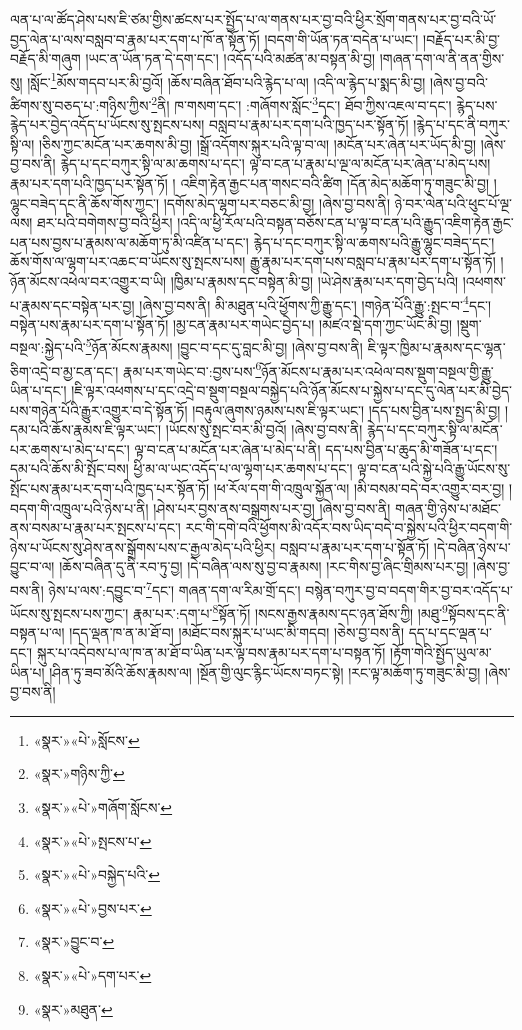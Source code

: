 ལན་པ་ལ་ཚོད་ཤེས་པས་ཇི་ཙམ་གྱིས་ཚངས་པར་སྤྱོད་པ་ལ་གནས་པར་བྱ་བའི་ཕྱིར་སྲོག་གནས་པར་བྱ་བའི་ཡོ་བྱད་ལེན་པ་ལས་བསླབ་བ་རྣམ་པར་དག་པ་ཁོ་ན་སྟོན་ཏོ། །བདག་གི་ཡོན་ཏན་བདེན་པ་ཡང་། །བརྗོད་པར་མི་བྱ་བརྗོད་མི་གཞུག །ཡང་ན་ཡོན་ཏན་དེ་དག་དང་། །འདོད་པའི་མཚན་མ་བསྟན་མི་བྱ། །གཞན་དག་ལ་ནི་ནན་གྱིས་སུ། །སློང་\footnote{«སྣར་»«པེ་»སློངས་}མོས་གདབ་པར་མི་བྱའོ། །ཆོས་བཞིན་ཐོབ་པའི་རྙེད་པ་ལ། །འདི་ལ་རྙེད་པ་སྨད་མི་བྱ། །ཞེས་བྱ་བའི་ཚིགས་སུ་བཅད་པ་:གཉིས་ཀྱིས་\footnote{«སྣར་»གཉིས་ཀྱི་}ནི། ཁ་གསག་དང་། :གཞོགས་སློང་\footnote{«སྣར་»«པེ་»གཞོག་སློངས་}དང་། ཐོབ་ཀྱིས་འཇལ་བ་དང་། རྙེད་པས་རྙེད་པར་བྱེད་འདོད་པ་ཡོངས་སུ་སྤངས་པས། བསླབ་པ་རྣམ་པར་དག་པའི་ཁྱད་པར་སྟོན་ཏོ། །རྙེད་པ་དང་ནི་བཀུར་སྟི་ལ། །ཅིས་ཀྱང་མངོན་པར་ཆགས་མི་བྱ། །སྒྲོ་འདོགས་སྐུར་པའི་ལྟ་བ་ལ། །མངོན་པར་ཞེན་པར་ཡོད་མི་བྱ། །ཞེས་བྱ་བས་ནི། རྙེད་པ་དང་བཀུར་སྟི་ལ་མ་ཆགས་པ་དང་། ལྟ་བ་ངན་པ་རྣམ་པ་ལྔ་ལ་མངོན་པར་ཞེན་པ་མེད་པས། རྣམ་པར་དག་པའི་ཁྱད་པར་སྟོན་ཏོ། །
འཇིག་རྟེན་རྒྱང་པན་གསང་བའི་ཚིག །དོན་མེད་མཆོག་ཏུ་གཟུང་མི་བྱ། །ལྷུང་བཟེད་དང་ནི་ཆོས་གོས་ཀྱང་། །དགོས་མེད་ལྷག་པར་བཅང་མི་བྱ། །ཞེས་བྱ་བས་ནི། ཉེ་བར་ལེན་པའི་ཕུང་པོ་ལྔ་ལས། ཐར་པའི་བགེགས་བྱ་བའི་ཕྱིར། །འདི་ལ་ཕྱི་རོལ་པའི་བསྟན་བཅོས་ངན་པ་ལྟ་བ་ངན་པའི་རྒྱུད་འཇིག་རྟེན་རྒྱང་པན་པས་བྱས་པ་རྣམས་ལ་མཆོག་ཏུ་མི་འཛིན་པ་དང་། རྙེད་པ་དང་བཀུར་སྟི་ལ་ཆགས་པའི་རྒྱུ་ལྷུང་བཟེད་དང་། ཆོས་གོས་ལ་ལྷག་པར་འཆང་བ་ཡོངས་སུ་སྤངས་པས། རྒྱུ་རྣམ་པར་དག་པས་བསླབ་པ་རྣམ་པར་དག་པ་སྟོན་ཏོ། །ཉོན་མོངས་འཕེལ་བར་འགྱུར་བ་ཡི། །ཁྱིམ་པ་རྣམས་དང་བསྟེན་མི་བྱ། །ཡེ་ཤེས་རྣམ་པར་དག་བྱེད་པའི། །འཕགས་པ་རྣམས་དང་བསྟེན་པར་བྱ། །ཞེས་བྱ་བས་ནི། མི་མཐུན་པའི་ཕྱོགས་ཀྱི་རྒྱུ་དང་། །གཉེན་པོའི་རྒྱུ་:སྤང་བ་\footnote{«སྣར་»«པེ་»སྤངས་པ་}དང་། བསྟེན་པས་རྣམ་པར་དག་པ་སྟོན་ཏོ། །མྱ་ངན་རྣམ་པར་གཡེང་བྱེད་པ། །མཛའ་སྡེ་དག་ཀྱང་ཡོང་མི་བྱ། །སྡུག་བསྔལ་:སྐྱེད་པའི་\footnote{«སྣར་»«པེ་»བསྐྱེད་པའི་}ཉོན་མོངས་རྣམས། །བྱུང་བ་དང་དུ་བླང་མི་བྱ། །ཞེས་བྱ་བས་ནི། ཇི་ལྟར་ཁྱིམ་པ་རྣམས་དང་ལྷན་ཅིག་འདྲེ་བ་མྱ་ངན་དང་། རྣམ་པར་གཡེང་བ་:བྱས་པས་\footnote{«སྣར་»«པེ་»བྱས་པར་}ཉོན་མོངས་པ་རྣམ་པར་འཕེལ་བས་སྡུག་བསྔལ་གྱི་རྒྱུ་ཡིན་པ་དང་། །ཇི་ལྟར་འཕགས་པ་དང་འདྲེ་བ་སྡུག་བསྔལ་བསྐྱེད་པའི་ཉོན་མོངས་པ་སྐྱེས་པ་དང་དུ་ལེན་པར་མི་བྱེད་པས་གཉེན་པོའི་རྒྱུར་འགྱུར་བ་དེ་སྟོན་ཏོ། །བརྟུལ་ཞུགས་ཉམས་པས་ཇི་ལྟར་ཡང་། །དད་པས་བྱིན་པས་སྤྱད་མི་བྱ། །དམ་པའི་ཆོས་རྣམས་ཇི་ལྟར་ཡང་། །ཡོངས་སུ་སྤང་བར་མི་བྱའོ། །ཞེས་བྱ་བས་ནི། རྙེད་པ་དང་བཀུར་སྟི་ལ་མངོན་པར་ཆགས་པ་མེད་པ་དང་། ལྟ་བ་ངན་པ་མངོན་པར་ཞེན་པ་མེད་པ་ནི། དད་པས་བྱིན་པ་ཆུད་མི་གཟོན་པ་དང་། དམ་པའི་ཆོས་མི་སྤོང་བས། ཕྱི་མ་ལ་ཡང་འདོད་པ་ལ་ལྷག་པར་ཆགས་པ་དང་། ལྟ་བ་ངན་པའི་སྐྱེ་པའི་རྒྱུ་ཡོངས་སུ་སྤོང་པས་རྣམ་པར་དག་པའི་ཁྱད་པར་སྟོན་ཏོ། །ཕ་རོལ་དག་གི་འཁྲུལ་སྐྱོན་ལ། །མི་བསམ་བདེ་བར་འགྱུར་བར་བྱ། །བདག་གི་འཁྲུལ་པའི་ཉེས་པ་ནི། །ཤེས་པར་བྱས་ནས་བསྒྲགས་པར་བྱ། །ཞེས་བྱ་བས་ནི། གཞན་གྱི་ཉེས་པ་མཐོང་ནས་བསམ་པ་རྣམ་པར་སྤངས་པ་དང་། རང་གི་དགེ་བའི་ཕྱོགས་མི་འདོར་བས་ཡིད་བདེ་བ་སྐྱེས་པའི་ཕྱིར་བདག་གི་ཉེས་པ་ཡོངས་སུ་ཤེས་ནས་སྒྲོགས་པས་ང་རྒྱལ་མེད་པའི་ཕྱིར། བསླབ་པ་རྣམ་པར་དག་པ་སྟོན་ཏོ། །དེ་བཞིན་ཉེས་པ་བྱུང་བ་ལ། །ཆོས་བཞིན་དུ་ནི་རབ་ཏུ་བྱ། །དེ་བཞིན་ལས་སུ་བྱ་བ་རྣམས། །རང་གིས་བྱ་ཞིང་གྲིམས་པར་བྱ། །ཞེས་བྱ་བས་ནི། ཉེས་པ་ལས་:དབྱུང་བ་\footnote{«སྣར་»བྱུང་བ་}དང་། གཞན་དག་ལ་རིམ་གྲོ་དང་། བསྙེན་བཀུར་བྱ་བ་བདག་གིར་བྱ་བར་འདོད་པ་ཡོངས་སུ་སྤངས་པས་ཀྱང་། རྣམ་པར་:དག་པ་\footnote{«སྣར་»«པེ་»དག་པར་}སྟོན་ཏོ། །སངས་རྒྱས་རྣམས་དང་ཉན་ཐོས་ཀྱི། །མཐུ་\footnote{«སྣར་»མཐུན་}སྟོབས་དང་ནི་བསྟན་པ་ལ། །དད་ལྡན་ཁ་ན་མ་ཐོ་བ། །མཐོང་བས་སྐུར་པ་ཡང་མི་གདབ། །ཅེས་བྱ་བས་ནི། དད་པ་དང་ལྡན་པ་དང་། སྐུར་པ་འདེབས་པ་ལ་ཁ་ན་མ་ཐོ་བ་ཡིན་པར་ལྟ་བས་རྣམ་པར་དག་པ་བསྟན་ཏོ། །རྟོག་གེའི་སྤྱོད་ཡུལ་མ་ཡིན་པ། །ཤིན་ཏུ་ཟབ་མོའི་ཆོས་རྣམས་ལ། །སྔོན་གྱི་ལུང་རྙིང་ཡོངས་བཏང་སྟེ། །རང་ལྟ་མཆོག་ཏུ་གཟུང་མི་བྱ། །ཞེས་བྱ་བས་ནི། 